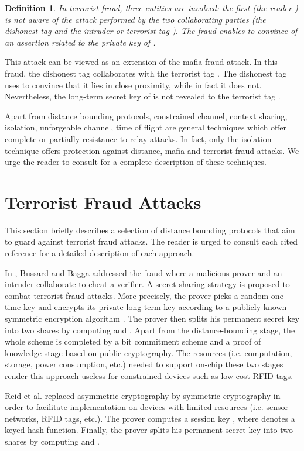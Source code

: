 \documentclass{article}
\newtheorem{definition}{Definition}
\begin{document}
\begin{definition}
In terrorist fraud, three entities are involved: the first (the reader ) is not aware of the attack performed by the two collaborating parties (the dishonest tag  and the intruder or terrorist tag ). The fraud enables  to convince  of an assertion related to the private key of .
\end{definition}

This attack can be viewed as an extension of the mafia fraud attack. In this fraud, the dishonest tag  collaborates with the terrorist tag . The dishonest tag  uses  to convince  that it lies in close proximity, while in fact it does not. Nevertheless, the long-term secret key of  is not revealed to the terrorist tag .

Apart from distance bounding protocols, constrained channel, context sharing, isolation, unforgeable channel, time of flight are general techniques which offer complete or partially resistance to relay attacks. In fact, only the isolation technique offers protection against distance, mafia and terrorist fraud attacks.  We urge the reader to consult \cite{BussardB05} for a complete description of these techniques.


\section{Terrorist Fraud Attacks}

This section briefly describes a selection of distance bounding protocols that aim to guard against terrorist fraud attacks. The reader is urged to consult each cited reference for a detailed description of each approach.

In \cite{BussardB05}, Bussard and Bagga addressed the fraud where a malicious prover and an intruder collaborate to cheat a verifier.  A secret sharing strategy is proposed to combat terrorist fraud attacks. More precisely, the prover picks a random one-time key  and encrypts its private long-term key  according to a publicly known symmetric encryption algorithm . The prover then splits his permanent secret key into two shares by computing  and .  Apart from the distance-bounding stage, the whole scheme is completed by a bit commitment scheme and a proof of knowledge stage based on public cryptography. The resources (i.e. computation, storage, power consumption, etc.) needed to support on-chip these two stages render this approach useless for constrained devices such as low-cost RFID tags.

Reid et al. \cite{reid2007} replaced asymmetric cryptography by symmetric cryptography in order to facilitate implementation on devices with limited resources (i.e. sensor networks, RFID tags, etc.). The prover computes a session key , where  denotes a keyed hash function. Finally, the prover splits his permanent secret key into two shares by computing  and .
\end{document}
